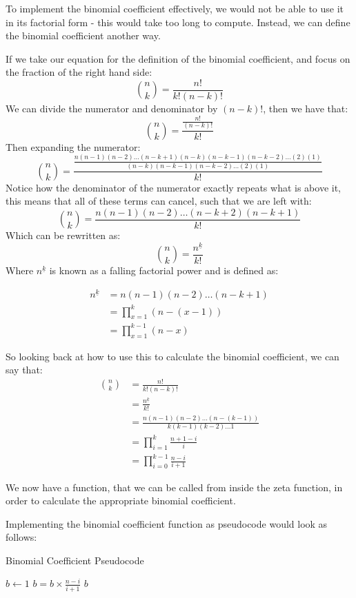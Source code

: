\documentclass[12pt]{article}
\begin{document}
To implement the binomial coefficient effectively, we would not be able to use it in its factorial form - this would take too long to compute. Instead, we can define the binomial coefficient another way.

If we take our equation for the definition of the binomial coefficient, and focus on the fraction of the right hand side:
$$\binom{n}{k} = \frac{n!}{k!(n-k)!}$$
We can divide the numerator and denominator by $(n-k)!$, then we have that:
$$\binom{n}{k} = \frac{\frac{n!}{(n-k)!}}{k!}$$
Then expanding the numerator:
$$\binom{n}{k} = \frac{\frac{n(n-1)(n-2)\dots(n-k+1)(n-k)(n-k-1)(n-k-2)\dots(2)(1)}{(n-k)(n-k-1)(n-k-2)\dots(2)(1)}}{k!}$$
Notice how the denominator of the numerator exactly repeats what is above it, this means that all of these terms can cancel, such that we are left with:
$$\binom{n}{k} = \frac{n(n-1)(n-2)\dots(n-k+2)(n-k+1)}{k!}$$
Which can be rewritten as:
$$\binom{n}{k} = \frac{n^{\underline{k}}}{k!}$$
Where $n^{\underline{k}}$ is known as a falling factorial power and is defined as:

\begin{align*}
    n^{\underline{k}} &= n(n-1)(n-2) \dots (n-k+1)\\
    &= \prod_{x=1}^k (n - (x - 1))\\
    &= \prod_{x=1}^{k-1} (n - x)
\end{align*}

So looking back at how to use this to calculate the binomial coefficient, we can say that:
\begin{align*}
    \binom{n}{k} &= \frac{n!}{k!(n-k)!}\\
    &= \frac{n^{\underline{k}}}{k!}\\
    &= \frac{n(n-1)(n-2)\dots (n-(k-1))}{k(k-1)(k-2) \dots 1}\\
    &= \prod^k_{i=1} \frac{n+1-i}{i}\\
    &= \prod^{k-1}_{i=0} \frac{n-i}{i+1}
\end{align*}

We now have a function, that we can be called from inside the zeta function, in order to calculate the appropriate binomial coefficient.

Implementing the binomial coefficient function as pseudocode would look as follows:

\begin{algorithm}[ht]
    \caption{Binomial Coefficient Pseudocode}
    \begin{algorithmic}
            \State $b \gets 1$
                \State $b = b \times \frac{n-i}{i+1}$
            \EndFor
            \State \Return $b$
        \EndFunction
    \end{algorithmic}
\end{algorithm}
\end{document}

